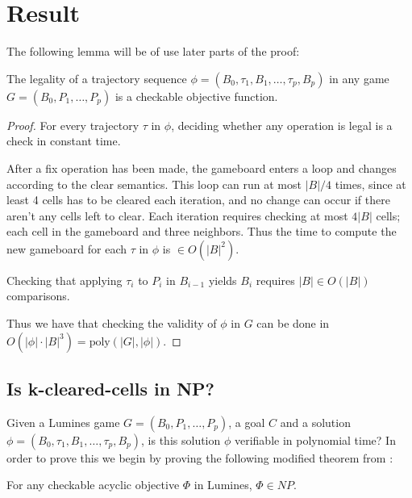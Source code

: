 \section{Result}
The following lemma will be of use later parts of the proof:\\

\begin{lem}
\label{lem:legality}
The legality of a trajectory sequence $\phi=(B_0, \tau_1, B_1, \ldots ,\tau_p, B_p)$ in any game $G=(B_0, P_1, \ldots, P_p)$ is a checkable objective function.
\end{lem}

\begin{proof}
For every trajectory $\tau$ in $\phi$, deciding whether any operation is legal is a check in constant time.

After a fix operation has been made, the gameboard enters a loop and changes according to the clear semantics. This loop can run at most $|B| / 4$ times, since at least 4 cells has to be cleared each iteration, and no change can occur if there aren't any cells left to clear. Each iteration requires checking at most $4|B|$ cells; each cell in the gameboard and three neighbors. Thus the time to compute the new gameboard for each $\tau$ in $\phi$ is $\in O(|B|^2)$.

Checking that applying $\tau_i$ to $P_i$ in $B_{i-1}$ yields $B_i$ requires $|B| \in O(|B|)$ comparisons. 

Thus we have that checking the validity of $\phi$ in $G$ can be done in $O(|\phi| \cdot |B|^3) = \text{poly}(|G|, |\phi|)$. 
\end{proof}

\subsection{Is k-cleared-cells in NP?}

Given a Lumines game $G = (B_0, P_1, \ldots, P_p)$, a goal $C$ and a solution $\phi = (B_0, \tau_1, B_1, \ldots ,\tau_p, B_p)$, is this solution $\phi$ verifiable in polynomial time? In order to prove this we begin by proving the following modified theorem from \cite{tetris}: \\

\begin{thm}
For any checkable acyclic objective $\Phi$ in Lumines, $\Phi \in NP$.
\end{thm}

